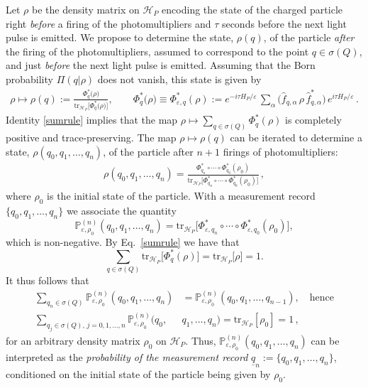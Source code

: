 \documentclass[11pt]{article}
\begin{document}
Let $\rho$ be the density matrix on $\mathcal{H}_{P}$ encoding the state of the charged particle 
right \textit{before} a firing of the photomultipliers and $\tau$ seconds before the next light pulse is emitted. 
We propose to determine the state, $\rho(q)$, of the particle \textit{after} the firing of the photomultipliers, assumed to
correspond to the point $q\in \sigma(Q)$, and just \textit{before} the next light pulse is emitted. Assuming that the Born
probability $\Pi(q \vert \rho)$ does not vanish, this state is given by
\begin{align}\label{state}
\rho \mapsto \rho(q):= \frac{\Phi_{q}^{*}\big(\rho\big)}{\text{tr}_{\mathcal{H}_P}
\big[\Phi_{q}^{*}\big(\rho\big)\big] }, \qquad
 \Phi_{q}^{*}\big(\rho\big)\equiv \Phi_{\varepsilon, q}^{*}(\rho) := 
e^{-i\tau H_P/\varepsilon}\,\sum_{\alpha}\Big(\widehat{f}_{q, \alpha}\, \rho\, \widehat{f}_{q, \alpha}^{*}\Big)\, 
e^{i\tau H_P/\varepsilon}\,.
\end{align}
Identity \eqref{sumrule} implies that the map $\rho \mapsto \sum_{q\in \sigma(Q)} \Phi^{*}_{q}(\rho)$ is completely 
positive and trace-preserving. The map $\rho \mapsto \rho(q)$ can be iterated to determine a state, 
$\rho(q_0, q_1, \dots , q_n)$, of the particle after $n+1$ firings of photomultipliers:
\begin{align}\label{track record}
\rho(q_0, q_1, \dots, q_n)= \frac{\Phi_{q_n}^{*} \circ \cdots \circ \Phi_{q_0}^{*}(\rho_0)}{\text{tr}_{\mathcal{H}_P}\big[\Phi_{q_n}^{*} \circ \cdots \circ \Phi_{q_0}^{*}(\rho_0)\big]}\,,
\end{align}
where $\rho_0 $ is the initial state of the particle.
With a measurement record $\big\{q_0, q_1, \dots, q_n\big\}$ we associate the quantity
\begin{equation}\label{proba}
\mathbb{P}_{\varepsilon, \rho_0}^{(n)}(q_0, q_1, \dots, q_n) =\text{tr}_{\mathcal{H}_P}\big[\Phi_{\varepsilon, q_n}^{*} \circ \cdots \circ \Phi_{\varepsilon, q_0}^{*}(\rho_0)\big],
\end{equation}
which is non-negative. By Eq.~\eqref{sumrule} we have that 
$$\sum_{q\in \sigma(Q)} \text{tr}_{\mathcal{H}_P}\big[\Phi_{q}^{*}(\rho)\big] = \text{tr}_{\mathcal{H}_P}\big[\rho\big] =1.$$
It thus follows that
\begin{align}\label{Kolmogorov}
\sum_{q_n\in \sigma(Q)} \mathbb{P}_{\varepsilon, \rho_0}^{(n)}(q_0,q_1, \dots, q_n) &= \mathbb{P}_{\varepsilon, \rho_0}^{(n)}(q_0,q_1, \dots, q_{n-1}), \quad \text{hence}\nonumber\\
\sum_{q_j\in \sigma(Q),\, j=0,1,\dots, n} \mathbb{P}_{\varepsilon, \rho_0}^{(n)}(q_0,&q_1, \dots, q_n) =
\text{tr}_{\mathcal{H}_P}[\rho_0]=1\,,
\end{align}
for an arbitrary density matrix $\rho_0$ on $\mathcal{H}_P$. Thus, 
$\mathbb{P}_{\varepsilon, \rho_0}^{(n)}(q_0,q_1, \dots, q_n)$ can be interpreted as the \textit{probability of the 
measurement record} $\underline{q}_n := \big\{q_0, q_1, \dots, q_n \big\}$, conditioned on the initial state of the particle being
given by $\rho_0$. 
\end{document}

